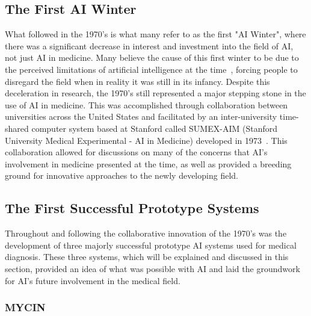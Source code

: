 \documentclass{article}
\begin{document}
\subsection{The First AI Winter}

What followed in the 1970's is what many refer to as the first "AI Winter", where there was a significant decrease in interest and investment into the field of AI, not just AI in medicine. Many believe the cause of this first winter to be due to the perceived limitations of artificial intelligence at the time~\cite{kaul_history_2020}, forcing people to disregard the field when in reality it was still in its infancy. Despite this deceleration in research, the 1970's still represented a major stepping stone in the use of AI in medicine. This was accomplished through collaboration between universities across the United States and facilitated by an inter-university time-shared computer system based at Stanford called SUMEX-AIM (Stanford University Medical Experimental - AI in Medicine) developed in 1973~\cite{kulikowski_beginnings_2019}. This collaboration allowed for discussions on many of the concerns that AI's involvement in medicine presented at the time, as well as provided a breeding ground for innovative approaches to the newly developing field. 

\subsection{The First Successful Prototype Systems}

Throughout and following the collaborative innovation of the 1970's was the development of three majorly successful prototype AI systems used for medical diagnosis. These three systems, which will be explained and discussed in this section, provided an idea of what was possible with AI and laid the groundwork for AI's future involvement in the medical field.

\subsubsection{MYCIN}
\end{document}
